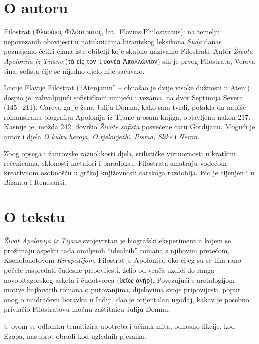 \section*{O autoru}

Filostrat \textgreek[variant=ancient]{(Φλαούιος Φιλόστρατος,} lat.\ Flavius Philostratus): na temelju nepovezanih obavijesti u natuknicama bizantskog leksikona \textit{Suda} danas poznajemo četiri člana iste obitelji koje skupno nazivamo Filostrati. Autor \textit{Života Apolonija iz Tijane} \textgreek[variant=ancient]{(τὰ εἰς τὸν Τυανέα Ἀπολλώνιον)} sin je prvog Filostrata, Verova sina, sofista čije se nijedno djelo nije sačuvalo. 

Lucije Flavije Filostrat (``Atenjanin'' – obnašao je dvije visoke dužnosti u Ateni) dospio je, zahvaljujući sofističkom umijeću i vezama, na dvor Septimija Severa (145.–211). Careva ga je žena Julija Domna, kako sam tvrdi, potakla da napiše romansiranu biografiju Apolonija iz Tijane u osam knjiga, objavljenu nakon 217. Kasnije je, možda 242, dovršio \textit{Živote sofista} posvećene caru Gordijanu. Mogući je autor i djela \textit{O kultu heroja, O tjelovježbi, Pisma, Slike} i \textit{Neron}. 

Zbog opsega i žanrovske raznolikosti djela, stilističke virtuoznosti u kratkim rečenicama, sklonosti metafori i paradoksu, Filostrata smatraju vodećom kreativnom osobnošću u grčkoj književnosti carskoga razdoblja. Bio je cijenjen i u Bizantu i Renesansi.

\section*{O tekstu}

\textit{Život Apolonija iz Tijane} svojevrstan je biografski eksperiment u kojem se prožimaju aspekti tada omiljenih ``idealnih'' romana s njihovim pretečom, Ksenofonotovom \textit{Kirupedijom}. Filostrat je Apolonija, oko čijeg su se lika rano počele raspredati čudesne pripovijesti, želio od vrača uzdići do ranga novopitagorskog asketa i čudotvorca \textgreek[variant=ancient]{(θεῖος ἀνήρ).} Povezujući s aretalogijom motive bajkovitih romana o putovanjima, dijelovima svoje pripovijesti, poput onog o mudračevu boravku u Indiji, dao je orijentalan ugođaj, kakav je posebno privlačio Filostratovu moćnu zaštitnicu Juliju Domnu. 

U ovom se odlomku tematizira upotreba i učinak mita, odnosno fikcije, kod Ezopa, nasuprot obradi kod uglednih pjesnika.


